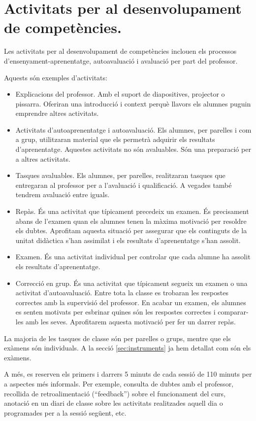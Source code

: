 \documentclass[catalan, a4paper, 12pt, titlepage]{article}
\begin{document}
\section{Activitats per al desenvolupament de competències.}
\label{sec:activitats}

Les activitats per al desenvolupament de competències inclouen els processos d'ensenyament-aprenentatge, autoavaluació i avaluació per part del professor.

Aquests són exemples d'activitats:
\begin{itemize}
	\item Explicacions del professor. Amb el suport de diapositives, projector o pissarra. Oferiran una introducció i context perquè llavors els alumnes puguin emprendre altres activitats.
	\item Activitats d'autoaprenentatge i autoavaluació. Els alumnes, per parelles i com a grup, utilitzaran material que els permetrà adquirir els resultats d'aprenentatge. Aquestes activitats no són avaluables. Són una preparació per a altres activitats.
	\item Tasques avaluables. Els alumnes, per parelles, realitzaran tasques que entregaran al professor per a l'avaluació i qualificació. A vegades també tendrem avaluació entre iguals.
	\item Repàs. És una activitat que típicament precedeix un examen.
És precisament abans de l'examen quan els alumnes tenen la màxima motivació per resoldre els dubtes.
Aprofitam aquesta situació per assegurar que els continguts de la unitat didàctica s'han assimilat i els resultats d'aprenentatge s'han assolit.
	\item Examen. És una activitat individual per controlar que cada alumne ha assolit els resultats d'aprenentatge.
	\item Correcció en grup. És una activitat que típicament segueix un examen o una activitat d'autoavaluació. Entre tota la classe es trobaran les respostes correctes amb la supervisió del professor. En acabar un examen, els alumnes es senten motivats per esbrinar quines són les respostes correctes i comparar-les amb les seves. Aprofitarem aquesta motivació per fer un darrer repàs.

\end{itemize}

La majoria de les tasques de classe són per parelles o grups, mentre que els exàmens són individuals.
A la secció \ref{sec:instruments} ja hem detallat com són els exàmens.

A més, es reserven els primers i darrers 5 minuts de cada sessió de 110 minuts per a aspectes més informals.
Per exemple, consulta de dubtes amb el professor, recollida de retroalimentació (``feedback'') sobre el funcionament del curs, anotació en un diari de classe sobre les activitats realitzades aquell dia o programades per a la sessió següent, etc.
\end{document}
